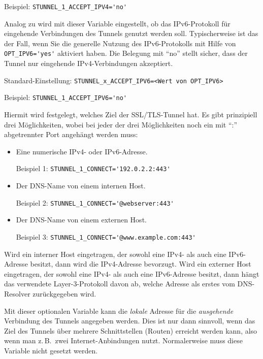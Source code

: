 \begin{description}
Beispiel: \verb+STUNNEL_1_ACCEPT_IPV4='no'+


Analog zu  wird mit dieser Variable eingestellt,
ob das IPv6-Protokoll für eingehende Verbindungen des Tunnels genutzt werden
soll. Typischerweise ist das der Fall, wenn Sie die generelle Nutzung des
IPv6-Protokolls mit Hilfe von \verb+OPT_IPV6='yes'+ aktiviert haben. Die
Belegung mit ``no'' stellt sicher, dass der Tunnel nur eingehende
IPv4-Verbindungen akzeptiert.

Standard-Einstellung: \verb+STUNNEL_x_ACCEPT_IPV6=<Wert von OPT_IPV6>+

Beispiel: \verb+STUNNEL_1_ACCEPT_IPV6='no'+


Hiermit wird festgelegt, welches Ziel der SSL/TLS-Tunnel hat. Es gibt
prinzipiell drei Möglichkeiten, wobei bei jeder der drei Möglichkeiten noch ein
mit ``:'' abgetrennter Port angehängt werden muss:

\begin{itemize}
\item Eine numerische IPv4- oder IPv6-Adresse.

Beispiel 1: \verb+STUNNEL_1_CONNECT='192.0.2.2:443'+

\item Der DNS-Name von einem internen Host.

Beispiel 2: \verb+STUNNEL_1_CONNECT='@webserver:443'+

\item Der DNS-Name von einem externen Host.

Beispiel 3: \verb+STUNNEL_1_CONNECT='@www.example.com:443'+
\end{itemize}

Wird ein interner Host eingetragen, der sowohl eine IPv4- als auch eine
IPv6-Adresse besitzt, dann wird die IPv4-Adresse bevorzugt. Wird ein externer
Host eingetragen, der sowohl eine IPv4- als auch eine IPv6-Adresse besitzt,
dann hängt das verwendete Layer-3-Protokoll davon ab, welche Adresse als erstes
vom DNS-Resolver zurückgegeben wird.


Mit dieser optionalen Variable kann die \emph{lokale} Adresse für die
\emph{ausgehende} Verbindung des Tunnels angegeben werden. Dies ist nur dann
sinnvoll, wenn das Ziel des Tunnels über mehrere Schnittstellen (Routen)
erreicht werden kann, also wenn man z.\,B.\ zwei Internet-Anbindungen nutzt.
Normalerweise muss diese Variable nicht gesetzt werden.


\end{description}

